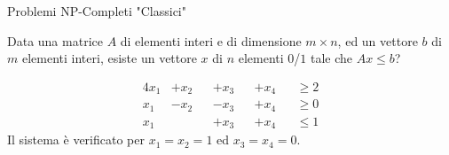 \begin{frame}{Problemi NP-Completi "Classici"}
	
\vspace{-9pt}
\begin{myboxtitle}
Data una matrice $A$ di elementi interi e di dimensione $m \times n$, ed un
vettore $b$ di $m$ elementi interi, esiste un vettore $x$ di $n$ elementi $0$/$1$ tale che $Ax \le b$?
\end{myboxtitle}

\begin{myboxtitle}[Esempio]
\begin{alignat*}{4}
x_1 &+ x_2 &&+ x_3 &&+ x_4 &&\ge 2\\
x_1 &- x_2 &&- x_3 &&+ x_4 &&\ge 0\\
x_1 &&&+ x_3 &&+ x_4 &&\le 1
\end{alignat*}
Il sistema è verificato per $x_1 = x_2 = 1$ ed $x_3 = x_4 = 0$.
\end{myboxtitle}

\end{frame}


